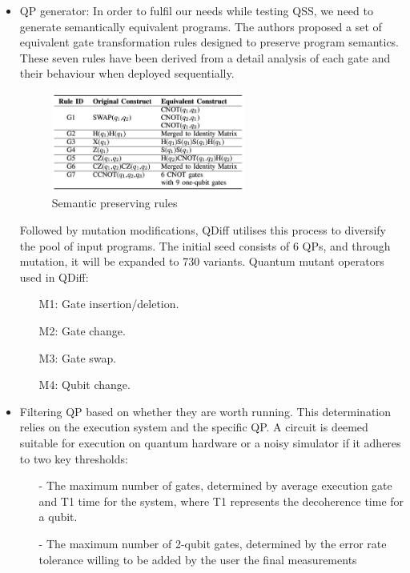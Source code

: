 \newpage
\begin{itemize}
    \item QP generator: In order to fulfil our needs while testing QSS, we need to generate semantically equivalent programs. The authors proposed a set of equivalent gate transformation rules designed to preserve program semantics. These seven rules have been derived from a detail analysis of each gate and their behaviour when deployed sequentially.
    \begin{figure}[H]
        \centering
        \includegraphics[width=0.6\textwidth]{TFM/photos/QDiffRules.png}
        \caption{Semantic preserving rules \cite{wang2021qdiff}} 
        \label{Fig:QDiffRules}
    \end{figure}

    Followed by mutation modifications, QDiff utilises this process to diversify the pool of input programs. The initial seed consists of 6 QPs, and through mutation, it will be expanded to 730 variants. Quantum mutant operators used in QDiff:
        \begin{itemize}
            \item[] M1: Gate insertion/deletion.
            \item[] M2: Gate change.
            \item[] M3: Gate swap.
            \item[] M4: Qubit change.
        \end{itemize}

    \item Filtering QP based on whether they are worth running. This determination relies on the execution system and the specific QP. A circuit is deemed suitable for execution on quantum hardware or a noisy simulator if it adheres to two key thresholds:
    
    \begin{itemize}
        \item[-] The maximum number of gates, determined by average execution gate and T1 time for the system, where T1 represents the decoherence time for a qubit. 
        \item[-] The maximum number of 2-qubit gates, determined by the error rate tolerance willing to be added by the user  the final measurements 
    \end{itemize}


\end{itemize}
